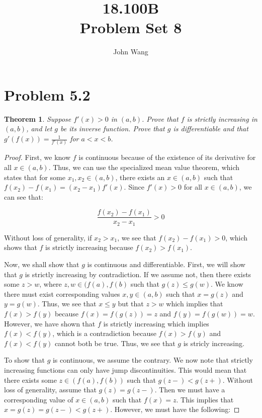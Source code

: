 \documentclass[psamsfonts]{amsart}
\title{18.100B \\
Problem Set 8}
\author{John Wang}
\newtheorem{thm}{Theorem}[section]
\theoremstyle{definition}
\theoremstyle{remark}
\numberwithin{equation}{section}
\begin{document}
\maketitle

\section{Problem 5.2}

\begin{thm}
Suppose $f'(x) >0$ in $(a,b)$. Prove that $f$ is strictly increasing in $(a,b)$, and let $g$ be its inverse function. Prove that $g$ is differentiable and that $g'(f(x)) = \frac{1}{f'(x)}$ for $a < x < b$. 
\end{thm}

\begin{proof}
First, we know $f$ is continuous because of the existence of its derivative for all $x \in (a,b)$. Thus, we can use the specialized mean value theorem, which states that for some $x_1,x_2 \in (a,b)$, there exists an $x \in (a,b)$ such that $f(x_2) - f(x_1) = (x_2 - x_1) f'(x)$. Since $f'(x) > 0$ for all $x \in (a,b)$, we can see that:

\begin{equation}
\frac{f(x_2) - f(x_1)}{x_2 - x_1}> 0
\end{equation}

Without loss of generality, if $x_2 > x_1$, we see that $f(x_2) - f(x_1) > 0$, which shows that $f$ is strictly increasing because $f(x_2) > f(x_1)$. 

Now, we shall show that $g$ is continuous and differentiable. First, we will show that $g$ is strictly increasing by contradiction. If we assume not, then there exists some $z > w$, where $z,w \in (f(a),f(b)$ such that $g(z) \leq g(w)$. We know there must exist corresponding values $x,y \in (a,b)$ such that $x = g(z)$ and $y = g(w)$. Thus, we see that $x \leq y$ but that $z > w$ which implies that $f(x) > f(y)$ because $f(x) = f(g(z)) = z$ and $f(y) = f(g(w)) = w$. However, we have shown that $f$ is strictly increasing which implies $f(x) < f(y)$, which is a contradiction because $f(x) > f(y)$ and $f(x) < f(y)$ cannot both be true. Thus, we see that $g$ is stricly increasing.

To show that $g$ is continuous, we assume the contrary. We now note that strictly increasing functions can only have jump discontinuities. This would mean that there exists some $z \in (f(a),f(b))$ such that $g(z-) < g(z+)$. Without loss of generality, assume that $g(z) = g(z-)$. Then we must have a corresponding value of $x \in (a,b)$ such that $f(x) = z$. This implies that $x = g(z) = g(z-) < g(z+)$. However, we must have the following:


\end{proof}
\end{document}
